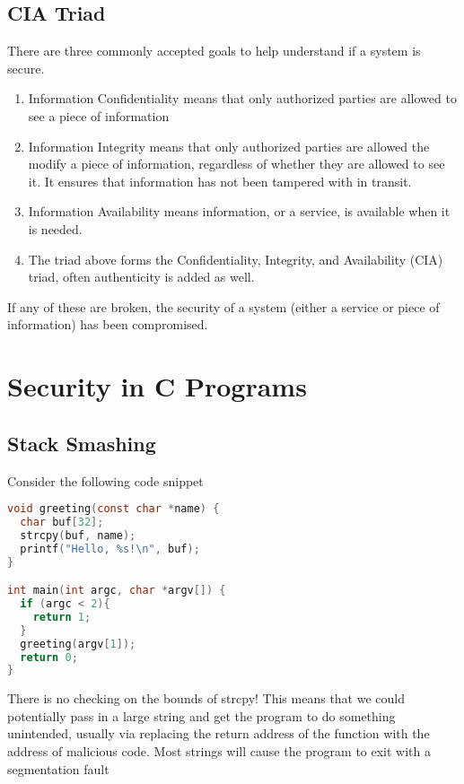 
\subsection{CIA Triad}

There are three commonly accepted goals to help understand if a system is secure.

\begin{enumerate}
\item Information Confidentiality means that only authorized parties are allowed to see a piece of information
\item Information Integrity means that only authorized parties are allowed the modify a piece of information, regardless of whether they are allowed to see it.
  It ensures that information has not been tampered with in transit.
\item Information Availability means information, or a service, is available when it is needed.
\item The triad above forms the Confidentiality, Integrity, and Availability (CIA) triad, often authenticity is added as well.
\end{enumerate}

If any of these are broken, the security of a system (either a service or piece of information) has been compromised.

\section{Security in C Programs}

\subsection{Stack Smashing}

Consider the following code snippet

\begin{lstlisting}[language=C]
void greeting(const char *name) {
  char buf[32];
  strcpy(buf, name);
  printf("Hello, %s!\n", buf);
}

int main(int argc, char *argv[]) {
  if (argc < 2){
    return 1;
  }
  greeting(argv[1]);
  return 0;
}
\end{lstlisting}

There is no checking on the bounds of strcpy!
This means that we could potentially pass in a large string and get the program to do something unintended, usually via replacing the return address of the function with the address of malicious code.
Most strings will cause the program to exit with a segmentation fault

